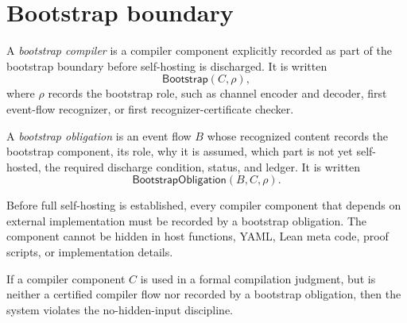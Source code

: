 \section{Bootstrap boundary}
\label{sec:self-hosting-compiler-bootstrap-boundary}

\begin{definition}
\label{def:self-hosting-compiler-bootstrap-compiler}
A \emph{bootstrap compiler} is a compiler component explicitly recorded as part of the bootstrap boundary before self-hosting is discharged. It is written
$$
  \mathsf{Bootstrap}(C,\rho),
$$
where $\rho$ records the bootstrap role, such as channel encoder and decoder, first event-flow recognizer, or first recognizer-certificate checker.
\end{definition}

\begin{definition}
\label{def:self-hosting-compiler-bootstrap-obligation}
A \emph{bootstrap obligation} is an event flow $B$ whose recognized content records the bootstrap component, its role, why it is assumed, which part is not yet self-hosted, the required discharge condition, status, and ledger. It is written
$$
  \mathsf{BootstrapObligation}(B,C,\rho).
$$
\end{definition}

\begin{principle}
\label{prin:self-hosting-compiler-bootstrap-explicit}
Before full self-hosting is established, every compiler component that depends on external implementation must be recorded by a bootstrap obligation. The component cannot be hidden in host functions, YAML, Lean meta code, proof scripts, or implementation details.
\end{principle}

\begin{theorem}
\label{thm:self-hosting-compiler-hidden-bootstrap-violates}
If a compiler component $C$ is used in a formal compilation judgment, but is neither a certified compiler flow nor recorded by a bootstrap obligation, then the system violates the no-hidden-input discipline.
\end{theorem}


